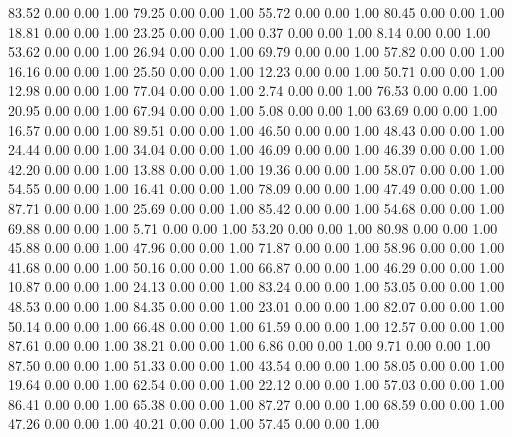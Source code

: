    83.52   0.00   0.00   1.00
   79.25   0.00   0.00   1.00
   55.72   0.00   0.00   1.00
   80.45   0.00   0.00   1.00
   18.81   0.00   0.00   1.00
   23.25   0.00   0.00   1.00
    0.37   0.00   0.00   1.00
    8.14   0.00   0.00   1.00
   53.62   0.00   0.00   1.00
   26.94   0.00   0.00   1.00
   69.79   0.00   0.00   1.00
   57.82   0.00   0.00   1.00
   16.16   0.00   0.00   1.00
   25.50   0.00   0.00   1.00
   12.23   0.00   0.00   1.00
   50.71   0.00   0.00   1.00
   12.98   0.00   0.00   1.00
   77.04   0.00   0.00   1.00
    2.74   0.00   0.00   1.00
   76.53   0.00   0.00   1.00
   20.95   0.00   0.00   1.00
   67.94   0.00   0.00   1.00
    5.08   0.00   0.00   1.00
   63.69   0.00   0.00   1.00
   16.57   0.00   0.00   1.00
   89.51   0.00   0.00   1.00
   46.50   0.00   0.00   1.00
   48.43   0.00   0.00   1.00
   24.44   0.00   0.00   1.00
   34.04   0.00   0.00   1.00
   46.09   0.00   0.00   1.00
   46.39   0.00   0.00   1.00
   42.20   0.00   0.00   1.00
   13.88   0.00   0.00   1.00
   19.36   0.00   0.00   1.00
   58.07   0.00   0.00   1.00
   54.55   0.00   0.00   1.00
   16.41   0.00   0.00   1.00
   78.09   0.00   0.00   1.00
   47.49   0.00   0.00   1.00
   87.71   0.00   0.00   1.00
   25.69   0.00   0.00   1.00
   85.42   0.00   0.00   1.00
   54.68   0.00   0.00   1.00
   69.88   0.00   0.00   1.00
    5.71   0.00   0.00   1.00
   53.20   0.00   0.00   1.00
   80.98   0.00   0.00   1.00
   45.88   0.00   0.00   1.00
   47.96   0.00   0.00   1.00
   71.87   0.00   0.00   1.00
   58.96   0.00   0.00   1.00
   41.68   0.00   0.00   1.00
   50.16   0.00   0.00   1.00
   66.87   0.00   0.00   1.00
   46.29   0.00   0.00   1.00
   10.87   0.00   0.00   1.00
   24.13   0.00   0.00   1.00
   83.24   0.00   0.00   1.00
   53.05   0.00   0.00   1.00
   48.53   0.00   0.00   1.00
   84.35   0.00   0.00   1.00
   23.01   0.00   0.00   1.00
   82.07   0.00   0.00   1.00
   50.14   0.00   0.00   1.00
   66.48   0.00   0.00   1.00
   61.59   0.00   0.00   1.00
   12.57   0.00   0.00   1.00
   87.61   0.00   0.00   1.00
   38.21   0.00   0.00   1.00
    6.86   0.00   0.00   1.00
    9.71   0.00   0.00   1.00
   87.50   0.00   0.00   1.00
   51.33   0.00   0.00   1.00
   43.54   0.00   0.00   1.00
   58.05   0.00   0.00   1.00
   19.64   0.00   0.00   1.00
   62.54   0.00   0.00   1.00
   22.12   0.00   0.00   1.00
   57.03   0.00   0.00   1.00
   86.41   0.00   0.00   1.00
   65.38   0.00   0.00   1.00
   87.27   0.00   0.00   1.00
   68.59   0.00   0.00   1.00
   47.26   0.00   0.00   1.00
   40.21   0.00   0.00   1.00
   57.45   0.00   0.00   1.00
